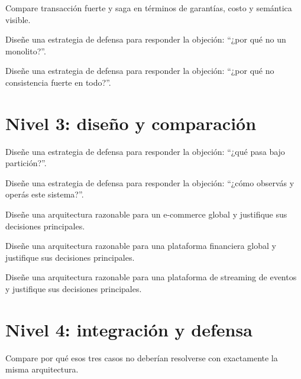\documentclass[variant=guia,cover=institutional,mode=screen]{ua-engineering-v6-article}
\begin{document}
\begin{uaexercise}
Compare transacción fuerte y saga en términos de garantías, costo y semántica visible.
\end{uaexercise}

\begin{uaexercise}
Diseñe una estrategia de defensa para responder la objeción: “¿por qué no un monolito?”.
\end{uaexercise}

\begin{uaexercise}
Diseñe una estrategia de defensa para responder la objeción: “¿por qué no consistencia fuerte en todo?”.
\end{uaexercise}


\section{Nivel 3: diseño y comparación}
\begin{uaexercise}
Diseñe una estrategia de defensa para responder la objeción: “¿qué pasa bajo partición?”.
\end{uaexercise}

\begin{uaexercise}
Diseñe una estrategia de defensa para responder la objeción: “¿cómo observás y operás este sistema?”.
\end{uaexercise}

\begin{uaexercise}
Diseñe una arquitectura razonable para un e-commerce global y justifique sus decisiones principales.
\end{uaexercise}

\begin{uaexercise}
Diseñe una arquitectura razonable para una plataforma financiera global y justifique sus decisiones principales.
\end{uaexercise}

\begin{uaexercise}
Diseñe una arquitectura razonable para una plataforma de streaming de eventos y justifique sus decisiones principales.
\end{uaexercise}


\section{Nivel 4: integración y defensa}
\begin{uaexercise}
Compare por qué esos tres casos no deberían resolverse con exactamente la misma arquitectura.
\end{uaexercise}
\end{document}
